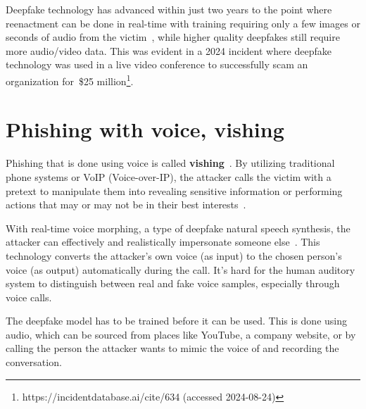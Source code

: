 Deepfake technology has advanced within just two years to the point where reenactment can be done in real-time with training requiring only a few images or seconds of audio from the victim~\citep{mirsky_Threat_Offensive_AI_Organizations_2023}, while higher quality deepfakes still require more audio/video data. This was evident in a 2024 incident where deepfake technology was used in a live video conference to successfully scam an organization for~\$25 million\footnote{https://incidentdatabase.ai/cite/634 (accessed 2024-08-24)}.

















\section{Phishing with voice, vishing}
\begin{comment}
What to cover:
    - Including spear phishing with video in this section?
    

\end{comment}

Phishing that is done using voice is called \textbf{vishing}~\citep{doan_BTSE_Audio_Deepfake_Detection_2023}. By utilizing traditional phone systems or VoIP (Voice-over-IP), the attacker calls the victim with a pretext to manipulate them into revealing sensitive information or performing actions that may or may not be in their best interests~\citep{hadnagy_Social_Engineering_The_Science_2018}.



With real-time voice morphing, a type of deepfake natural speech synthesis, the attacker can effectively and realistically impersonate someone else~\citep{doan_BTSE_Audio_Deepfake_Detection_2023}. This technology converts the attacker's own voice (as input) to the chosen person's voice (as output) automatically during the call. It's hard for the human auditory system to distinguish between real and fake voice samples, especially through voice calls.

The deepfake model has to be trained before it can be used. This is done using audio, which can be sourced from places like YouTube, a company website, or by calling the person the attacker wants to mimic the voice of and recording the conversation.

